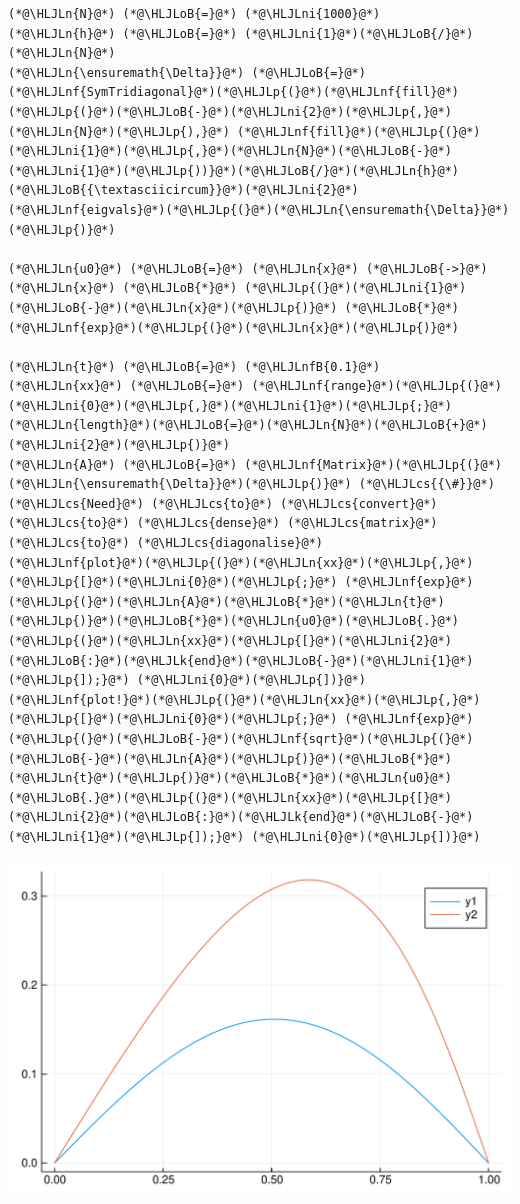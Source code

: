\documentclass[12pt,a4paper]{article}
\newcommand{\HLJLk}[1]{\textcolor[RGB]{148,91,176}{\textbf{#1}}}
\newcommand{\HLJLn}[1]{#1}
\newcommand{\HLJLnf}[1]{\textcolor[RGB]{66,102,213}{#1}}
\newcommand{\HLJLnfB}[1]{\textcolor[RGB]{59,151,46}{#1}}
\newcommand{\HLJLni}[1]{\textcolor[RGB]{59,151,46}{#1}}
\newcommand{\HLJLoB}[1]{\textcolor[RGB]{102,102,102}{\textbf{#1}}}
\newcommand{\HLJLp}[1]{#1}
\newcommand{\HLJLcs}[1]{\textcolor[RGB]{153,153,119}{\textit{#1}}}
\begin{document}
\begin{lstlisting}
(*@\HLJLn{N}@*) (*@\HLJLoB{=}@*) (*@\HLJLni{1000}@*)
(*@\HLJLn{h}@*) (*@\HLJLoB{=}@*) (*@\HLJLni{1}@*)(*@\HLJLoB{/}@*)(*@\HLJLn{N}@*)
(*@\HLJLn{\ensuremath{\Delta}}@*) (*@\HLJLoB{=}@*) (*@\HLJLnf{SymTridiagonal}@*)(*@\HLJLp{(}@*)(*@\HLJLnf{fill}@*)(*@\HLJLp{(}@*)(*@\HLJLoB{-}@*)(*@\HLJLni{2}@*)(*@\HLJLp{,}@*)(*@\HLJLn{N}@*)(*@\HLJLp{),}@*) (*@\HLJLnf{fill}@*)(*@\HLJLp{(}@*)(*@\HLJLni{1}@*)(*@\HLJLp{,}@*)(*@\HLJLn{N}@*)(*@\HLJLoB{-}@*)(*@\HLJLni{1}@*)(*@\HLJLp{))}@*)(*@\HLJLoB{/}@*)(*@\HLJLn{h}@*)(*@\HLJLoB{{\textasciicircum}}@*)(*@\HLJLni{2}@*)
(*@\HLJLnf{eigvals}@*)(*@\HLJLp{(}@*)(*@\HLJLn{\ensuremath{\Delta}}@*)(*@\HLJLp{)}@*)

(*@\HLJLn{u0}@*) (*@\HLJLoB{=}@*) (*@\HLJLn{x}@*) (*@\HLJLoB{->}@*) (*@\HLJLn{x}@*) (*@\HLJLoB{*}@*) (*@\HLJLp{(}@*)(*@\HLJLni{1}@*)(*@\HLJLoB{-}@*)(*@\HLJLn{x}@*)(*@\HLJLp{)}@*) (*@\HLJLoB{*}@*) (*@\HLJLnf{exp}@*)(*@\HLJLp{(}@*)(*@\HLJLn{x}@*)(*@\HLJLp{)}@*)

(*@\HLJLn{t}@*) (*@\HLJLoB{=}@*) (*@\HLJLnfB{0.1}@*)
(*@\HLJLn{xx}@*) (*@\HLJLoB{=}@*) (*@\HLJLnf{range}@*)(*@\HLJLp{(}@*)(*@\HLJLni{0}@*)(*@\HLJLp{,}@*)(*@\HLJLni{1}@*)(*@\HLJLp{;}@*) (*@\HLJLn{length}@*)(*@\HLJLoB{=}@*)(*@\HLJLn{N}@*)(*@\HLJLoB{+}@*)(*@\HLJLni{2}@*)(*@\HLJLp{)}@*)
(*@\HLJLn{A}@*) (*@\HLJLoB{=}@*) (*@\HLJLnf{Matrix}@*)(*@\HLJLp{(}@*)(*@\HLJLn{\ensuremath{\Delta}}@*)(*@\HLJLp{)}@*) (*@\HLJLcs{{\#}}@*) (*@\HLJLcs{Need}@*) (*@\HLJLcs{to}@*) (*@\HLJLcs{convert}@*) (*@\HLJLcs{to}@*) (*@\HLJLcs{dense}@*) (*@\HLJLcs{matrix}@*) (*@\HLJLcs{to}@*) (*@\HLJLcs{diagonalise}@*)
(*@\HLJLnf{plot}@*)(*@\HLJLp{(}@*)(*@\HLJLn{xx}@*)(*@\HLJLp{,}@*) (*@\HLJLp{[}@*)(*@\HLJLni{0}@*)(*@\HLJLp{;}@*) (*@\HLJLnf{exp}@*)(*@\HLJLp{(}@*)(*@\HLJLn{A}@*)(*@\HLJLoB{*}@*)(*@\HLJLn{t}@*)(*@\HLJLp{)}@*)(*@\HLJLoB{*}@*)(*@\HLJLn{u0}@*)(*@\HLJLoB{.}@*)(*@\HLJLp{(}@*)(*@\HLJLn{xx}@*)(*@\HLJLp{[}@*)(*@\HLJLni{2}@*)(*@\HLJLoB{:}@*)(*@\HLJLk{end}@*)(*@\HLJLoB{-}@*)(*@\HLJLni{1}@*)(*@\HLJLp{]);}@*) (*@\HLJLni{0}@*)(*@\HLJLp{])}@*)
(*@\HLJLnf{plot!}@*)(*@\HLJLp{(}@*)(*@\HLJLn{xx}@*)(*@\HLJLp{,}@*) (*@\HLJLp{[}@*)(*@\HLJLni{0}@*)(*@\HLJLp{;}@*) (*@\HLJLnf{exp}@*)(*@\HLJLp{(}@*)(*@\HLJLoB{-}@*)(*@\HLJLnf{sqrt}@*)(*@\HLJLp{(}@*)(*@\HLJLoB{-}@*)(*@\HLJLn{A}@*)(*@\HLJLp{)}@*)(*@\HLJLoB{*}@*)(*@\HLJLn{t}@*)(*@\HLJLp{)}@*)(*@\HLJLoB{*}@*)(*@\HLJLn{u0}@*)(*@\HLJLoB{.}@*)(*@\HLJLp{(}@*)(*@\HLJLn{xx}@*)(*@\HLJLp{[}@*)(*@\HLJLni{2}@*)(*@\HLJLoB{:}@*)(*@\HLJLk{end}@*)(*@\HLJLoB{-}@*)(*@\HLJLni{1}@*)(*@\HLJLp{]);}@*) (*@\HLJLni{0}@*)(*@\HLJLp{])}@*)
\end{lstlisting}

\includegraphics[width=\linewidth]{figures/Lecture9_7_1.pdf}
\end{document}
